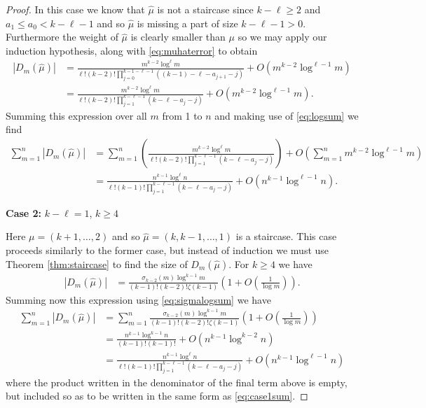 \documentclass{article}
\theoremstyle{plain}
\theoremstyle{definition}
\begin{document}
\begin{proof}
In this case we know that $\hat\mu$ is not a staircase since $k-\ell \geq 2$ and $a_1 \leq a_0 < k-\ell -1$ and so $\hat \mu$ is missing a part of size $k-\ell -1>0$.  Furthermore the weight of $\hat\mu$ is clearly smaller than $\mu$ so we may apply our induction hypothesis, along with \eqref{eq:muhaterror} to obtain
\begin{align}
|D_m(\hat\mu)| &=\frac{m^{k-2}\log^\ell m}{\ell!(k-2)!
\prod_{j=0}^{k-1-\ell -1} ((k-1)-\ell - a_{j+1} - j)}+O\left(m^{k-2}\log^{\ell-1}m\right) \nonumber \\
& =\frac{m^{k-2}\log^\ell m}{\ell!(k-2)!
\prod_{j=1}^{k-\ell-1}\left(k-\ell-a_{j}-j\right)}+O\left(m^{k-2}\log^{\ell-1}m\right).
\end{align}
Summing this expression over all $m$ from 1 to $n$ and making use of \eqref{eq:logsum} we find
\begin{align}
	\sum_{m=1}^{n} |D_m(\hat\mu)| 
	&= \sum_{m=1}^{n}\left( \frac{m^{k-2}\log^\ell m}{\ell!(k-2)!
\prod_{j=1}^{k-\ell-1}(k-\ell-a_j-j)}\right)
+ O\left(\sum\limits_{m=1}^n m^{k-2}\log^{\ell-1} m\right)  \nonumber \\
	&=\frac{n^{k-1}\log^\ell n}{\ell!(k-1)!
\prod_{j=1}^{k-\ell-1}\left(k-\ell-a_{j}-j\right)} + O\left(n^{k-1}\log^{\ell-1} n\right). \label{eq:case1sum}
\end{align}

\medskip\noindent
\textbf{Case 2:} $k-\ell = 1$, $k\geq 4$
\medskip

Here $\mu = (k+1,\ldots, 2)$  and so $\hat \mu = (k,k-1,\ldots, 1)$ is a staircase. This case proceeds similarly to the former case, but instead of induction we must use Theorem \ref{thm:staircase} to find the size of $D_m(\hat \mu)$.  For $k\geq 4$ we have
\begin{align*}
    |D_{m}(\hat\mu)| &= 
\frac{\sigma_{k-2}(m)\log^{k-1} m}{(k-1)!(k-2)! \zeta(k-1)}\left(1 + O\left(\frac{1}{\log m}\right)\right).
\end{align*}
Summing now this expression using \eqref{eq:sigmalogsum} we have
\begin{align}
	\sum_{m=1}^{n} |D_m(\hat\mu)| 
	&= \sum_{m=1}^{n} \frac{\sigma_{k-2}(m)\log^{k-1} m}{(k-1)!(k-2)! \zeta(k-1)}\left(1 + O\left(\frac{1}{\log m}\right)\right) \nonumber \\
	&=\frac{n^{k-1}\log^{k-1} n}{(k-1)!(k-1)!} + O\left(n^{k-1}\log^{k-2} n\right) \nonumber \\
	&=\frac{n^{k-1}\log^\ell n}{\ell!(k-1)!
\prod_{j=1}^{k-\ell-1}\left(k-\ell-a_{j}-j\right)} + O\left(n^{k-1}\log^{\ell-1} n\right) \label{eq:case2sum}
\end{align}
where the product written in the denominator of the final term above is empty, but included so as to be written in the same form as \eqref{eq:case1sum}.


\end{proof}
\end{document}
